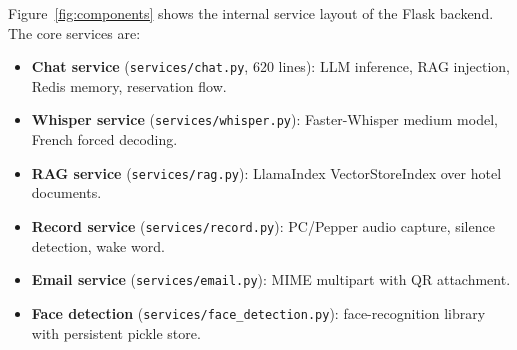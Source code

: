 \documentclass[a4paper]{article}
\begin{document}
Figure~\ref{fig:components} shows the internal service layout of the Flask backend. The core services are:
\begin{itemize}
  \item \textbf{Chat service} (\texttt{services/chat.py}, 620 lines): LLM inference, RAG injection, Redis memory, reservation flow.
  \item \textbf{Whisper service} (\texttt{services/whisper.py}): Faster-Whisper medium model, French forced decoding.
  \item \textbf{RAG service} (\texttt{services/rag.py}): LlamaIndex VectorStoreIndex over hotel documents.
  \item \textbf{Record service} (\texttt{services/record.py}): PC/Pepper audio capture, silence detection, wake word.
  \item \textbf{Email service} (\texttt{services/email.py}): MIME multipart with QR attachment.
  \item \textbf{Face detection} (\texttt{services/face\_detection.py}): face-recognition library with persistent pickle store.
\end{itemize}
\end{document}
